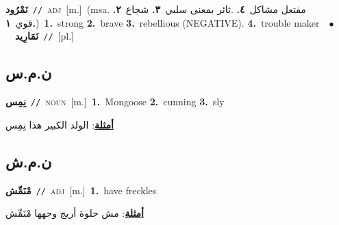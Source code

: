 \documentclass[10pt,a4paper,twoside]{article} %
\begin{document}
\begin{multicols}{2}
{\setlength\topsep{0pt}\textbf{\foreignlanguage{arabic}{نَمْرُود}}\ {\color{gray}\texttt{//}\color{black}}\ \textsc{adj}\ [m.]\ \color{gray}(msa. \foreignlanguage{arabic}{مفتعل مشاكل}~\foreignlanguage{arabic}{\textbf{٤.}}  .\foreignlanguage{arabic}{ثائر بمعنى سلبي}~\foreignlanguage{arabic}{\textbf{٣.}}  \foreignlanguage{arabic}{شجاع}~\foreignlanguage{arabic}{\textbf{٢.}}  \foreignlanguage{arabic}{قوي}~\foreignlanguage{arabic}{\textbf{١.}})\color{black}\ \textbf{1.}~strong  \textbf{2.}~brave  \textbf{3.}~rebellious (NEGATIVE).  \textbf{4.}~trouble maker\ \ $\bullet$\ \ \setlength\topsep{0pt}\textbf{\foreignlanguage{arabic}{نَمَارِيد}}\ {\color{gray}\texttt{//}\color{black}}\ [pl.]\ } \vspace{2mm}

\vspace{-3mm}
\subsection*{\color{blue}\foreignlanguage{arabic}{ن.م.س}\color{blue}{}} 

{\setlength\topsep{0pt}\textbf{\foreignlanguage{arabic}{نِمِس}}\ {\color{gray}\texttt{//}\color{black}}\ \textsc{noun}\ [m.]\ \textbf{1.}~Mongoose  \textbf{2.}~cunning  \textbf{3.}~sly\  \begin{flushright}\color{gray}\foreignlanguage{arabic}{\textbf{\underline{\foreignlanguage{arabic}{أمثلة}}}: الولد الكبير هذا نِمِس}\end{flushright}\color{black}} \vspace{2mm}

\vspace{-3mm}
\subsection*{\color{blue}\foreignlanguage{arabic}{ن.م.ش}\color{blue}{}} 

{\setlength\topsep{0pt}\textbf{\foreignlanguage{arabic}{مْنَمِّش}}\ {\color{gray}\texttt{//}\color{black}}\ \textsc{adj}\ [m.]\ \textbf{1.}~have freckles\  \begin{flushright}\color{gray}\foreignlanguage{arabic}{\textbf{\underline{\foreignlanguage{arabic}{أمثلة}}}: مش حلوة أريج وجهها مْنَمِّش}\end{flushright}\color{black}} \vspace{2mm}


\end{multicols}
\end{document}
